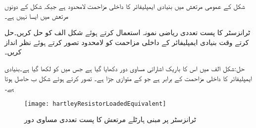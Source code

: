شکل  کے عمومی مرتعش میں بنیادی ایمپلیفائر کا داخلی مزاحمت لامحدود ہے جبکہ شکل  کے دونوں مرتعش میں ایسا نہیں ہے۔

ٹرانزسٹر کا پست تعددی ریاضی نمونہ استعمال کرتے ہوئے شکل  الف کو حل کریں۔حل کرتے وقت بنیادی ایمپلیفائر کے داخلی مزاحمت کو لامحدود تصور کرتے ہوئے نظر انداز کریں۔

حل:شکل  الف میں اس کا باریک اشاراتی مساوی دور دکھایا گیا ہے جس میں  کو  لکھا گیا ہے۔بنیادی ایمپلیفائر کا داخلی مزاحمت   کے برابر ہے جو  کے متوازی جڑا ہے۔ تصور کرتے ہوئے  شکل  ب حاصل ہوتا ہے۔
\begin{figure}
\centering
\texttt{[image: hartleyResistorLoadedEquivalent]}
\caption{ٹرانزسٹر پر مبنی ہارٹلے مرتعش کا پست تعددی مساوی دور}
\label{شکل_مرتعش_ہارٹلے_مساوی_پست_تعدد_داخلی_مزاحمت_لامحدود}
\end{figure}

